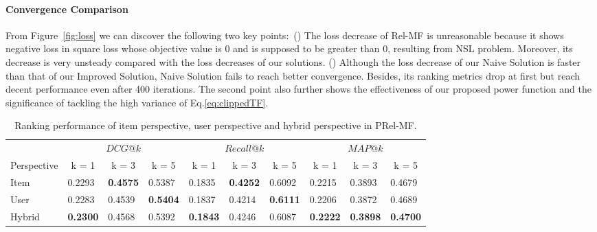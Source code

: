 \documentclass[sigconf]{acmart}
\begin{document}
\paragraph{Convergence Comparison} From Figure~\ref{fig:loss} we can discover the following two key points$\colon$ () The loss decrease of Rel-MF is unreasonable because it shows negative loss in square loss whose objective value is 0 and is supposed to be greater than 0, resulting from NSL problem. Moreover, its decrease is very unsteady compared with the loss decreases of our solutions. () Although the loss decrease of our Naive Solution is faster than that of our Improved Solution, Naive Solution fails to reach better convergence. Besides, its ranking metrics drop at first but reach decent performance even after 400 iterations. The second point also further shows the effectiveness of our proposed power function and the significance of tackling the high variance of Eq.\eqref{eq:clippedTF}.
\begin{table}[]
	\begin{tabular}{llllllllll}
		\hline
			\hline
		\multicolumn{1}{c}{}                              & \multicolumn{3}{c}{{ \textbf{ $DCG@k$}}}                            & \multicolumn{3}{c}{{\textbf{ $Recall@k$}}}                         & \multicolumn{3}{c}{{\textbf{ $MAP@k$}}}                            \\ \cline{2-10} 
		\multicolumn{1}{c}{\multirow{-2}{*}{Perspective}} & \multicolumn{1}{c}{k = 1} & \multicolumn{1}{c}{k = 3} & \multicolumn{1}{c}{k = 5} & \multicolumn{1}{c}{k = 1} & \multicolumn{1}{c}{k = 3} & \multicolumn{1}{c}{k = 5} & \multicolumn{1}{c}{k = 1} & \multicolumn{1}{c}{k = 3} & \multicolumn{1}{c}{k = 5} \\ \hline
		Item                                              & 0.2293                    & \textbf{0.4575}           & 0.5387                    & 0.1835                    & \textbf{0.4252}           & 0.6092                    & 0.2215                    & 0.3893                    & 0.4679                    \\ \hline
		User                                              & 0.2283                    & 0.4539                    & \textbf{0.5404}           & 0.1837                    & 0.4214                    & \textbf{0.6111}           & 0.2206                    & 0.3872                    & 0.4689                    \\ \hline
		Hybrid                                            & \textbf{0.2300}           & 0.4568                    & 0.5392                    & \textbf{0.1843}           & 0.4246                    & 0.6087                    & \textbf{0.2222}           & \textbf{0.3898}           & \textbf{0.4700}           \\ \hline
	\end{tabular}
	\caption{Ranking performance of item perspective, user perspective and hybrid perspective in PRel-MF.}
\label{tbl:varPerspective}
\end{table}
\end{document}
